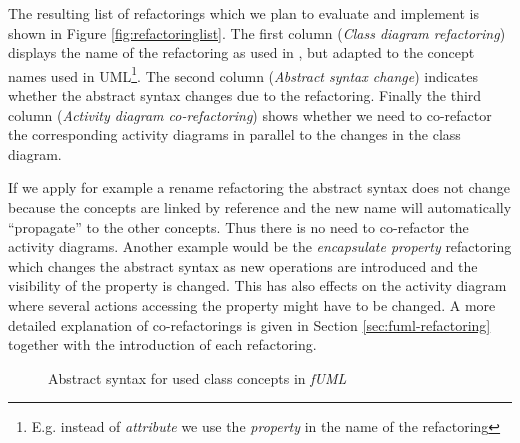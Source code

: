 \documentclass{llncs}
\begin{document}
The resulting list of 
refactorings which we plan to evaluate and implement is shown in Figure \ref{fig:refactoringlist}. 
The first column (\textit{Class diagram refactoring}) displays the name of the refactoring as used in \cite{DBLP:journals/sosym/MarkovicB08}, but adapted to the 
concept names used in UML\footnote{E.g. instead of \textit{attribute} we use the \textit{property} in the name of the refactoring}. 
The second column (\textit{Abstract syntax change}) indicates whether the abstract syntax changes due to the refactoring.
Finally the third column (\textit{Activity diagram co-refactoring}) shows whether we need to co-refactor the corresponding activity diagrams 
in parallel to the changes in the class diagram.

If we apply for example a rename refactoring the abstract syntax does not change because the concepts are linked 
by reference and the new name will automatically ``propagate'' to the other concepts. Thus there is no need to 
co-refactor the activity diagrams. Another example would be the \textit{encapsulate property} refactoring which 
changes the abstract syntax as new operations are introduced and the visibility of the property is changed. This 
has also effects on the activity diagram where several actions accessing the property might have to be changed. 
A more detailed explanation of co-refactorings is given in Section \ref{sec:fuml-refactoring} together with the introduction of each 
refactoring.

\begin{figure}[h!t]
 \centering
 \caption{Abstract syntax for used class concepts in \textit{fUML}}
 \label{fig:fuml1}
\end{figure}
\end{document}
